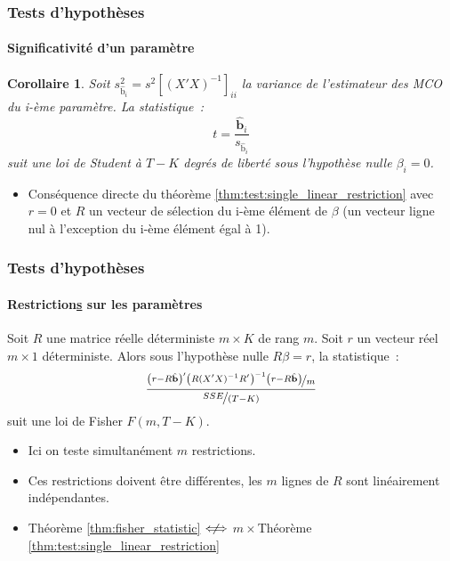 \documentclass[10pt]{beamer}
\theoremstyle{plain}
\newtheorem{cor}{Corollaire}
\begin{document}
\begin{frame}
  \frametitle{Tests d'hypothèses}
  \framesubtitle{Significativité d'un paramètre}

  \begin{cor}\label{cor:student_statistic}
    Soit $s_{\hat{\mathrm b}_i}^2 = s^2 \left[ (X'X)^{-1} \right]_{ii}$ la variance de l'estimateur des MCO du i-ème paramètre. La statistique~:
    \[
      t = \frac{\hat{\mathbf b}_i}{s_{\hat{\mathrm b}_i}}
    \]
    suit une loi de Student à $T-K$ degrés de liberté sous l'hypothèse nulle $\beta_i = 0$.
  \end{cor}

  \bigskip

  \begin{itemize}

  \item Conséquence directe du théorème
    \ref{thm:test:single_linear_restriction} avec $r = 0$ et $R$ un
    vecteur de sélection du i-ème élément de $\beta$ (un vecteur ligne
    nul à l'exception du i-ème élément égal à 1).\newline

  \end{itemize}

\end{frame}


\begin{frame}
  \frametitle{Tests d'hypothèses}
  \framesubtitle{Restriction\underline{s} sur les paramètres}

  \begin{theorem}\label{thm:fisher_statistic}
    Soit $R$ une matrice réelle déterministe $m\times K$ de rang $m$. Soit $r$ un vecteur réel  $m\times 1$ déterministe. Alors sous l'hypothèse nulle $R\beta=r$, la statistique~:
    \[
      \frac{\nicefrac{\left(r-R\hat{\mathbf b}\right)'\left( R(X'X)^{-1}R' \right)^{-1}\left(r-R\hat{\mathbf b}\right)}{m}}{\nicefrac{SSE}{(T-K)}}
    \]
 suit une loi de Fisher $F\left(m, T-K\right)$.
  \end{theorem}

  \bigskip

  \begin{itemize}

  \item Ici on teste simultanément $m$ restrictions.\newline

  \item Ces restrictions doivent être différentes, les $m$ lignes de $R$ sont linéairement indépendantes.\newline

  \item Théorème \ref{thm:fisher_statistic} $\centernot{\Longleftrightarrow}$  $m\times$Théorème \ref{thm:test:single_linear_restriction}

  \end{itemize}

\end{frame}
\end{document}
